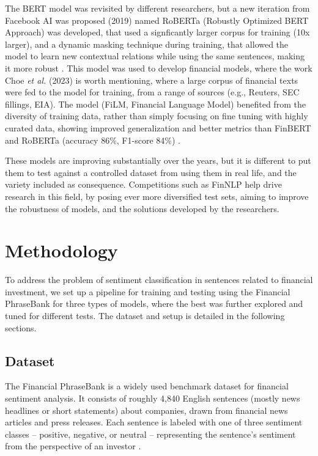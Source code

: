 \documentclass[conference]{IEEEtran}
\begin{document}
The BERT model was revisited by different researchers, but a new iteration from Facebook AI was proposed (2019) named RoBERTa (Robustly Optimized BERT Approach) was developed, that used a signficantly larger corpus for training (10x larger), and a dynamic masking technique during training, that allowed the model to learn new contextual relations while using the same sentences, making it more robust \cite{liu2019roberta}. This model was used to develop financial models, where the work Choe \textit{et al.} (2023) is worth mentioning, where a large corpus of financial texts were fed to the model for training, from a range of sources (e.g., Reuters, SEC fillings, EIA). The model (FiLM, Financial Language Model) benefited from the diversity of training data, rather than simply focusing on fine tuning with highly curated data, showing improved generalization and better metrics than FinBERT and RoBERTa (accuracy 86\%, F1-score 84\%) \cite{choe2023exploring}.

These models are improving substantially over the years, but it is different to put them to test against a controlled dataset from using them in real life, and the variety included as consequence. Competitions such as FinNLP help drive research in this field, by posing ever more diversified test sets, aiming to improve the robustness of models, and the solutions developed by the researchers.


\section{Methodology}

To address the problem of sentiment classification in sentences related to financial investment, we set up a pipeline for training and testing using the Financial PhraseBank for three types of models, where the best was further explored and tuned for different tests. The dataset and setup is detailed in the following sections.

\subsection{Dataset}

The Financial PhraseBank is a widely used benchmark dataset for financial sentiment analysis. It consists of roughly 4,840 English sentences (mostly news headlines or short statements) about companies, drawn from financial news articles and press releases. Each sentence is labeled with one of three sentiment classes – positive, negative, or neutral – representing the sentence’s sentiment from the perspective of an investor \cite{dataset, malo2013gooddebtbaddebt}.
\end{document}

